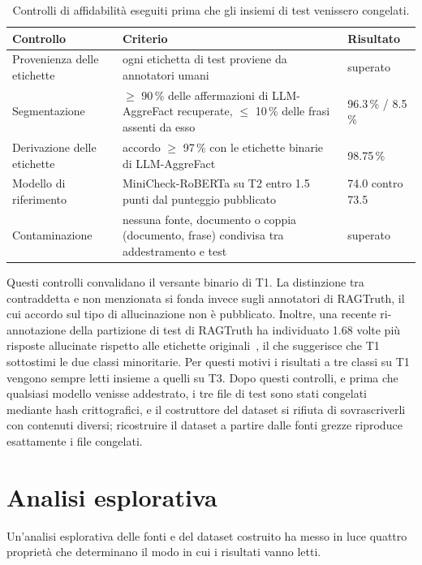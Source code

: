 \begin{table}[htbp]
\centering
\caption{Controlli di affidabilità eseguiti prima che gli insiemi di test venissero congelati.}
\label{tab:data-checks}
\small
\begin{tabularx}{\textwidth}{@{}lXl@{}}
\toprule
Controllo & Criterio & Risultato \\
\midrule
Provenienza delle etichette & ogni etichetta di test proviene da annotatori umani & superato \\
Segmentazione & $\geq$ 90\,\% delle affermazioni di LLM-AggreFact recuperate, $\leq$ 10\,\% delle frasi assenti da esso & 96.3\,\% / 8.5\,\% \\
Derivazione delle etichette & accordo $\geq$ 97\,\% con le etichette binarie di LLM-AggreFact & 98.75\,\% \\
Modello di riferimento & MiniCheck-RoBERTa su T2 entro 1.5 punti dal punteggio pubblicato & 74.0 contro 73.5 \\
Contaminazione & nessuna fonte, documento o coppia (documento, frase) condivisa tra addestramento e test & superato \\
\bottomrule
\end{tabularx}
\end{table}

Questi controlli convalidano il versante binario di T1. La distinzione tra contraddetta e non menzionata si fonda
invece sugli annotatori di RAGTruth, il cui accordo sul tipo di allucinazione non è pubblicato. Inoltre, una recente
ri-annotazione della partizione di test di RAGTruth ha individuato 1.68 volte più risposte allucinate rispetto alle
etichette originali~\cite{yu2026retromorphic}, il che suggerisce che T1 sottostimi le due classi minoritarie. Per questi
motivi i risultati a tre classi su T1 vengono sempre letti insieme a quelli su T3. Dopo questi controlli, e prima che
qualsiasi modello venisse addestrato, i tre file di test sono stati congelati mediante hash crittografici, e il
costruttore del dataset si rifiuta di sovrascriverli con contenuti diversi; ricostruire il dataset a partire dalle
fonti grezze riproduce esattamente i file congelati.

\section{Analisi esplorativa}
\label{sec:data-eda}

Un'analisi esplorativa delle fonti e del dataset costruito ha messo in luce quattro proprietà che determinano il modo
in cui i risultati vanno letti.

